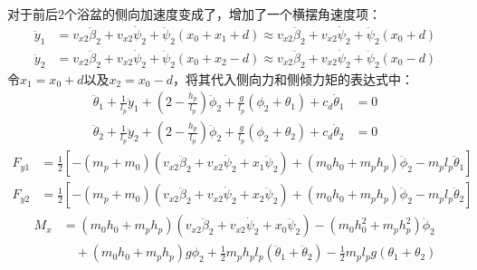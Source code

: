             对于前后2个浴盆的侧向加速度变成了，增加了一个横摆角速度项：
            \begin{equation}
            \begin{aligned}
            \ddot{y}_1 &= v_{x2}\ddot{\beta}_2 + v_{x2}\dot{\psi}_2 + \ddot{\psi}_2 (x_0 + x_1 + d) \approx v_{x2}\ddot{\beta}_2 + v_{x2}\dot{\psi}_2 + \ddot{\psi}_2 (x_0 + d) \\
            \ddot{y}_2 &= v_{x2}\ddot{\beta}_2 + v_{x2}\dot{\psi}_2 + \ddot{\psi}_2 (x_0 + x_2 - d) \approx v_{x2}\ddot{\beta}_2 + v_{x2}\dot{\psi}_2 + \ddot{\psi}_2 (x_0 - d)
            \end{aligned}
            \label{eq:ddyaw_input}
            \end{equation}
            令$x_1 = x_0 + d$以及$x_2 = x_0 - d$，将其代入侧向力和侧倾力矩的表达式中：
            \begin{equation}
            \begin{aligned}
            \ddot{\theta}_1 + \frac{1}{l_p} \ddot{y}_1 + \left(2 - \frac{h_p}{l_p}\right)\ddot{\phi}_2 + \frac{g}{l_p}(\phi_2 + \theta_1) + c_d \dot{\theta}_1 &= 0 \\
            \ddot{\theta}_2 + \frac{1}{l_p} \ddot{y}_2 + \left(2 - \frac{h_p}{l_p}\right)\ddot{\phi}_2 + \frac{g}{l_p}(\phi_2 + \theta_2) + c_d \dot{\theta}_2 &= 0
            \end{aligned}
            \end{equation}
            \begin{equation}
            \begin{aligned}
            F_{y1} &= \frac{1}{2}\left[ -(m_p + m_0)\left(v_{x2}\ddot{\beta}_2 + v_{x2}\dot{\psi}_2 + x_1 \ddot{\psi}_2\right) + (m_0 h_0 + m_p h_p)\ddot{\phi}_2 - m_p l_p \ddot{\theta}_1 \right] \\
            F_{y2} &= \frac{1}{2}\left[ -(m_p + m_0)\left(v_{x2}\ddot{\beta}_2 + v_{x2}\dot{\psi}_2 + x_2 \ddot{\psi}_2\right) + (m_0 h_0 + m_p h_p)\ddot{\phi}_2 - m_p l_p \ddot{\theta}_2 \right]
            \end{aligned}
            \end{equation}
            \begin{equation}
            \begin{aligned}
            M_x &= (m_0 h_0 + m_p h_p)\left(v_{x2}\ddot{\beta}_2 + v_{x2}\dot{\psi}_2 + x_0 \ddot{\psi}_2\right) - \left(m_0 h_0^2 + m_p h_p^2\right)\ddot{\phi}_2 \\
            &\quad + (m_0 h_0 + m_p h_p)g \phi_2 + \frac{1}{2}m_p h_p l_p (\ddot{\theta}_1 + \ddot{\theta}_2) - \frac{1}{2}m_p l_p g (\theta_1 + \theta_2)
            \end{aligned}
            \end{equation}
